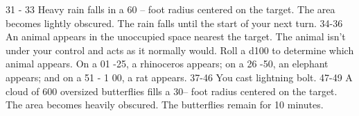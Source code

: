 31 - 33                                           Heavy rain falls in a 60 -- foot radius centered on  the target. The area becomes lightly obscured.  The rain falls until the start of your next turn.                                                                                                                                                                                                                                                                                                                                                                                                                                                                  
34-36                                             An animal appears in the unoccupied space  nearest the target. The animal isn't under your  control and acts as it normally would. Roll a d100  to determine which animal appears. On a 01 -25,  a rhinoceros appears; on a 26 -50, an elephant  appears; and on a 51 - 1 00, a rat appears.                                                                                                                                                                                                                                                                                                                            
37-46                                             You cast lightning bolt.                                                                                                                                                                                                                                                                                                                                                                                                                                                                                                                                                                                                
47-49                                             A cloud of 600 oversized butterflies fills a 30-- foot  radius centered on the target. The area becomes  heavily obscured. The butterflies remain for 10  minutes.                                                                                                                                                                                                                                                                                                                                                                                                                                                      
